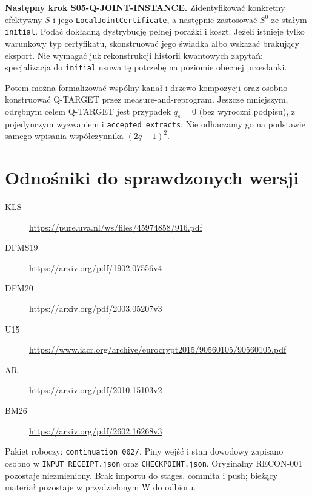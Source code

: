 \documentclass[11pt,a4paper]{article}
\newcommand{\code}[1]{\nolinkurl{#1}}
\begin{document}
\textbf{Następny krok S05-Q-JOINT-INSTANCE.}
Zidentyfikować konkretny efektywny $S$ i jego \code{LocalJointCertificate},
a następnie zastosować $S^0$ ze stałym \code{initial}. Podać dokładną
dystrybucję pełnej porażki i koszt. Jeżeli istnieje tylko warunkowy typ
certyfikatu, skonstruować jego świadka albo wskazać brakujący eksport.
Nie wymagać już rekonstrukcji historii kwantowych zapytań: specjalizacja
do \code{initial} usuwa tę potrzebę na poziomie obecnej przesłanki.

Potem można formalizować wspólny kanał i drzewo kompozycji oraz osobno
konstruować Q-TARGET przez measure-and-reprogram. Jeszcze mniejszym,
odrębnym celem Q-TARGET jest przypadek $q_s=0$ (bez wyroczni podpisu),
z pojedynczym wyzwaniem i \code{accepted_extracts}. Nie odhaczamy go
na podstawie samego wpisania współczynnika $(2q+1)^2$.

\section{Odnośniki do sprawdzonych wersji}
\begin{description}
\item[KLS] \url{https://pure.uva.nl/ws/files/45974858/916.pdf}
\item[DFMS19] \url{https://arxiv.org/pdf/1902.07556v4}
\item[DFM20] \url{https://arxiv.org/pdf/2003.05207v3}
\item[U15] \url{https://www.iacr.org/archive/eurocrypt2015/90560105/90560105.pdf}
\item[AR] \url{https://arxiv.org/pdf/2010.15103v2}
\item[BM26] \url{https://arxiv.org/pdf/2602.16268v3}
\end{description}
Pakiet roboczy: \code{continuation_002/}. Piny wejść i stan dowodowy
zapisano osobno w \code{INPUT_RECEIPT.json} oraz \code{CHECKPOINT.json}.
Oryginalny RECON-001 pozostaje niezmieniony. Brak importu do stages,
commita i push; bieżący materiał pozostaje w przydzielonym W do odbioru.
\end{document}
